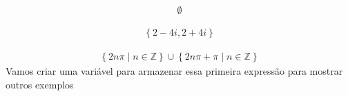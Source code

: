 \documentclass[letterpaper,10pt,english]{jupyterBook}
\begin{document}
\begin{sphinxVerbatim}[commandchars=\\\{\}]
     
\end{sphinxVerbatim}
\begin{equation*}
\begin{split}\displaystyle \emptyset\end{split}
\end{equation*}
\begin{sphinxVerbatim}[commandchars=\\\{\}]
     
\end{sphinxVerbatim}
\begin{equation*}
\begin{split}\displaystyle \left\{2 - 4 i, 2 + 4 i\right\}\end{split}
\end{equation*}
\begin{sphinxVerbatim}[commandchars=\\\{\}]
  
\end{sphinxVerbatim}
\begin{equation*}
\begin{split}\displaystyle \left\{2 n \pi\; |\; n \in \mathbb{Z}\right\} \cup \left\{2 n \pi + \pi\; |\; n \in \mathbb{Z}\right\}\end{split}
\end{equation*}
\sphinxAtStartPar
Vamos criar uma variável para armazenar essa primeira expressão para mostrar outros exemplos

\begin{sphinxVerbatim}[commandchars=\\\{\}]
      
\end{sphinxVerbatim}
\end{document}
